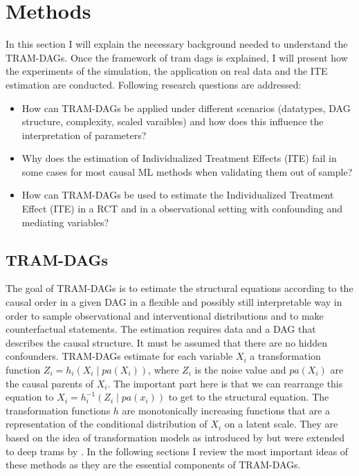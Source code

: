 



\chapter{Methods} 

In this section I will explain the necessary background needed to understand the TRAM-DAGs. Once the framework of tram dags is explained, I will present how the experiments of the simulation, the application on real data and the ITE estimation are conducted. Following research questions are addressed:

\begin{itemize}

\item How can TRAM-DAGs be applied under different scenarios (datatypes, DAG structure, complexity, scaled varaibles) and how does this influence the interpretation of parameters?
\item Why does the estimation of Individualized Treatment Effects (ITE) fail in some cases for most causal ML methods when validating them out of sample? 
\item How can TRAM-DAGs be used to estimate the Individualized Treatment Effect (ITE) in a RCT and in a observational setting with confounding and mediating variables?

\end{itemize}

\section{TRAM-DAGs}

The goal of TRAM-DAGs is to estimate the structural equations according to the causal order in a given DAG in a flexible and possibly still interpretable way in order to sample observational and interventional distributions and to make counterfactual statements. The estimation requires data and a DAG that describes the causal structure. It must be assumed that there are no hidden confounders. TRAM-DAGs estimate for each variable $X_i$ a transformation function $Z_i = h_i(X_i \mid pa(X_i))$, where $Z_i$ is the noise value and $pa(X_i)$ are the causal parents of $X_i$. The important part here is that we can rearrange this equation to $X_i = h_i^{-1}(Z_i \mid pa(x_i))$ to get to the structural equation. The transformation functions $h$ are monotonically increasing functions that are a representation of the conditional distribution of $X_i$ on a latent scale. They are based on the idea of transformation models as introduced by \citet{hothorn2014} but were extended to deep trams by \citet{sick2020}. In the following sections I review the most important ideas of these methods as they are the essential components of TRAM-DAGs.

